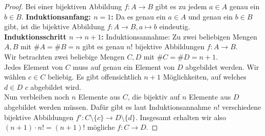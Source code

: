 \documentclass{article}
\begin{document}
\begin{enumerate}[a)]
\begin{proof}
		Bei einer bijektiven Abbildung $f : A \to B$ gibt es zu jedem $a\in A$ genau ein $b\in B$.
		\textbf{Induktionsanfang: $n = 1$:} \hspace*{3mm} Da es genau ein $a\in A$ und genau ein $b\in B$ gibt, ist die bijektive Abbildung 
		$f: A\to B, a\mapsto b$ eindeutig.\\
		\textbf{Induktionsschritt $n \to n+1$:}\hspace*{3mm} Induktionsannahme: Zu zwei beliebigen Mengen $A, B$ mit $\# A = \# B = n$ gibt es genau $n!$ bijektive Abbildungen $f : A \to B$.\\
		Wir betrachten zwei beliebige Mengen $C, D$ mit $\#C = \#D = n+1$.\\
		Jedes Element von $C$ muss auf genau ein Element von $D$ abgebildet werden. Wir wählen $c\in C$ beliebig. Es gibt offensichtlich $n+1$ Möglichkeiten, auf welches $d\in D$ $c$ abgebildet wird.\\
		Nun verbleiben noch $n$ Elemente aus $C$, die bijektiv auf $n$ Elemente aus $D$ abgebildet werden müssen. Dafür gibt es laut Induktionsannahme $n!$ verschiedene bijektive Abbildungen $f': C\setminus\{c\} \to D\setminus\{d\}$. Insgesamt erhalten wir also $(n+1) \cdot n! = (n+1)!$ mögliche $f: C \to D$.
	\end{proof}
\end{enumerate}
\end{document}
